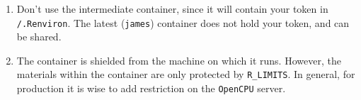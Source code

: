 \documentclass[
]{book}
\providecommand{\tightlist}{%
  \setlength{\itemsep}{0pt}\setlength{\parskip}{0pt}}
\begin{document}
\begin{enumerate}
\def\labelenumi{\arabic{enumi}.}
\tightlist
\item
  Don't use the intermediate container, since it will contain your token in \texttt{/.Renviron}. The latest (\texttt{james}) container does not hold your token, and can be shared.
\item
  The container is shielded from the machine on which it runs. However, the materials within the container are only protected by \texttt{R\_LIMITS}. In general, for production it is wise to add restriction on the \texttt{OpenCPU} server.
\end{enumerate}

  
\end{document}
